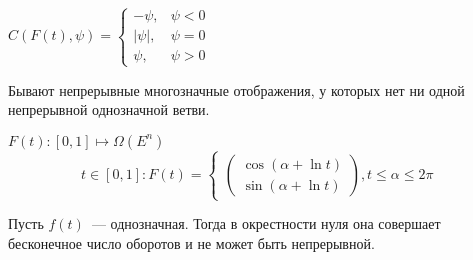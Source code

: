 \begin{exmp}
    $C(F(t), \psi) = \begin{cases}
        -\psi, &\psi < 0 \\
        |\psi|, &\psi = 0 \\
        \psi, &\psi > 0
    \end{cases}$
\end{exmp}

\begin{exmp}
    Бывают непрерывные многозначные отображения, у которых нет ни одной непрерывной однозначной ветви.

    $F(t)\colon [0, 1] \mapsto \Omega(E^n)$
    \begin{equation*}
        t \in [0, 1]\colon F(t) = \begin{cases}
            \left(
            \begin{matrix}
                \cos(\alpha + \ln t) \\
                \sin(\alpha + \ln t)
            \end{matrix}
            \right), t \leqslant \alpha \leqslant 2\pi
        \end{cases}
    \end{equation*}

    Пусть $f(t)$~--- однозначная.
    Тогда в окрестности нуля она совершает бесконечное число оборотов и не может быть непрерывной.
\end{exmp}